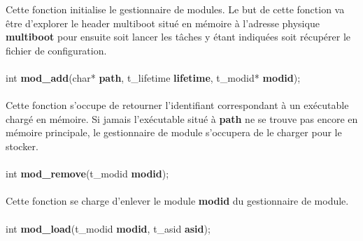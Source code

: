 \documentclass[10pt,a4wide]{article}
\begin{document}
Cette fonction initialise le gestionnaire de modules. Le but de cette fonction
va \^etre d'explorer le header multiboot situ\'e en m\'emoire \`a
l'adresse physique \textbf{multiboot} pour ensuite soit lancer les t\^aches
y \'etant indiqu\'ees soit r\'ecup\'erer le fichier de configuration.

\paragraph{}

\hspace{1.5cm}int \textbf{mod\_add}(char* \textbf{path},
                                    t\_lifetime \textbf{lifetime},
                                    t\_modid* \textbf{modid});

\paragraph{}

Cette fonction s'occupe de retourner l'identifiant correspondant \`a un
ex\'ecutable charg\'e en m\'emoire. Si jamais l'ex\'ecutable situ\'e \`a
\textbf{path} ne se trouve pas encore en m\'emoire principale, le gestionnaire
de module s'occupera de le charger pour le stocker.

\paragraph{}

\hspace{1.5cm}int \textbf{mod\_remove}(t\_modid \textbf{modid});

\paragraph{}

Cette fonction se charge d'enlever le module \textbf{modid} du gestionnaire
de module.

\paragraph{}

\hspace{1.5cm}int \textbf{mod\_load}(t\_modid \textbf{modid},
                                     t\_asid \textbf{asid});

\paragraph{}
\end{document}
